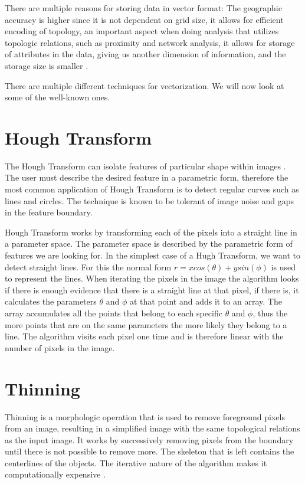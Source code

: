 There are multiple reasons for storing data in vector format: The geographic accuracy is higher since it is not dependent on grid size, it allows for efficient encoding of topology, an important aspect when doing analysis that utilizes topologic relations, such as proximity and network analysis, it allows for storage of attributes in the data, giving us another dimension of information, and the storage size is smaller \cite{Dharmaraj2005}.

There are multiple different techniques for vectorization. We will now look at some of the well-known ones.

\section{Hough Transform}
The Hough Transform can isolate features of particular shape within images \cite{Dori1997}. The user must describe the desired feature in a parametric form, therefore the most common application of Hough Transform is to detect regular curves such as lines and circles. The technique is known to be tolerant of image noise and gaps in the feature boundary.

Hough Transform works by transforming each of the pixels into a straight line in a parameter space. The parameter space is described by the parametric form of features we are looking for. In the simplest case of a Hugh Transform, we want to detect straight lines. For this the normal form $r = x cos(\theta) + y sin(\phi)$ is used to represent the lines. When iterating the pixels in the image the algorithm looks if there is enough evidence that there is a straight line at that pixel, if there is, it calculates the parameters $\theta$ and $\phi$ at that point and adds it to an array. The array accumulates all the points that belong to each specific $\theta$ and $\phi$, thus the more points that are on the same parameters the more likely they belong to a line. The algorithm visits each pixel one time and is therefore linear with the number of pixels in the image.

\section{Thinning}
Thinning is a morphologic operation that is used to remove foreground pixels from an image, resulting in a simplified image with the same topological relations as the input image. It works by successively removing pixels from the boundary until there is not possible to remove more. The skeleton that is left contains the centerlines of the objects.  The iterative nature of the algorithm makes it computationally expensive \cite{Wenyin1999}.

